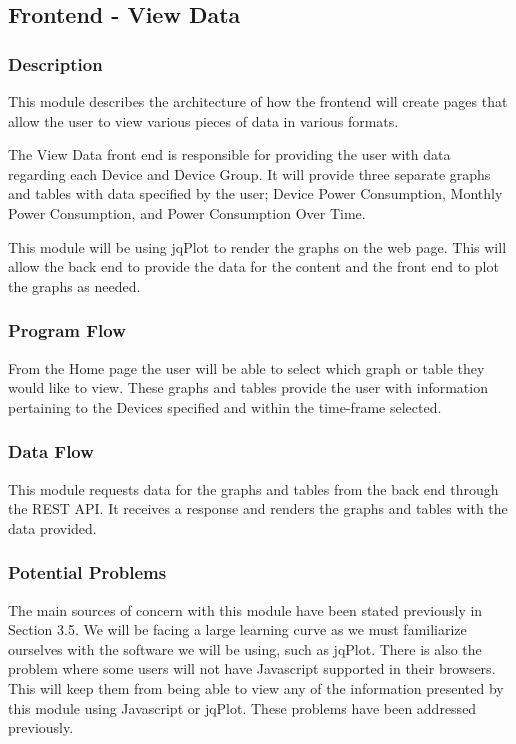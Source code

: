 
\subsection{Frontend - View Data}

\subsubsection{Description}

This module describes the architecture of how the frontend will create pages that allow the user to view various pieces of data in various formats.

The View Data front end is responsible for providing the user with data regarding each Device and Device Group. 
It will provide three separate graphs and tables with data specified by the user; 
Device Power Consumption, Monthly Power Consumption, and Power Consumption Over Time. 

This module will be using jqPlot to render the graphs on the web page. 
This will allow the back end to provide the data for the content and the front end to plot the graphs as needed. 

\subsubsection{Program Flow}

From the Home page the user will be able to select which graph or table they would like to view.  
These graphs and tables provide the user with information pertaining to the Devices specified and within the time-frame selected.  

\subsubsection{Data Flow}

This module requests data for the graphs and tables from the back end through the \ac{REST} \ac{API}. 
It receives a response and renders the graphs and tables with the data provided. 

\subsubsection{Potential Problems}

The main sources of concern with this module have been stated previously in Section 3.5. 
We will be facing a large learning curve as we must familiarize ourselves with the software we will be using, such as jqPlot. 
There is also the problem where some users will not have Javascript supported in their browsers. 
This will keep them from being able to view any of the information presented by this module using Javascript or jqPlot. 
These problems have been addressed previously. 

